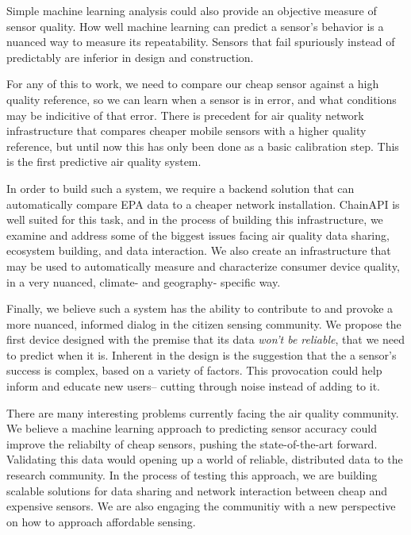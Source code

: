Simple machine learning analysis could also provide an objective measure of sensor quality.  How well machine learning can predict a sensor's behavior is a nuanced way to measure its repeatability.  Sensors that fail spuriously instead of predictably are inferior in design and construction.  
     
For any of this to work, we need to compare our cheap sensor against a high quality reference, so we can learn when a sensor is in error, and what conditions may be indicitive of that error.  There is precedent for air quality network infrastructure that compares cheaper mobile sensors with a higher quality reference, but until now this has only been done as a basic calibration step.  This is the first predictive air quality system. 

In order to build such a system, we require a backend solution that can automatically compare EPA data to a cheaper network installation.  ChainAPI is well suited for this task, and in the process of building this infrastructure, we examine and address some of the biggest issues facing air quality data sharing, ecosystem building, and data interaction.  We also create an infrastructure that may be used to automatically measure and characterize consumer device quality, in a very nuanced, climate- and geography- specific way.

Finally, we believe such a system has the ability to contribute to and provoke a more nuanced, informed dialog in the citizen sensing community.  We propose the first device designed with the premise that its data \textit{won't be reliable}, that we need to predict when it is.  Inherent in the design is the suggestion that the a sensor's success is complex, based on a variety of factors.  This provocation could help inform and educate new users-- cutting through noise instead of adding to it.

There are many interesting problems currently facing the air quality community.  We believe a machine learning approach to predicting sensor accuracy could improve the reliabilty of cheap sensors, pushing the state-of-the-art forward.   Validating this data would opening up a world of reliable, distributed data to the research community.  In the process of testing this approach, we are building scalable solutions for data sharing and network interaction between cheap and expensive sensors.  We are also engaging the communitiy with a new perspective on how to approach affordable sensing.   



